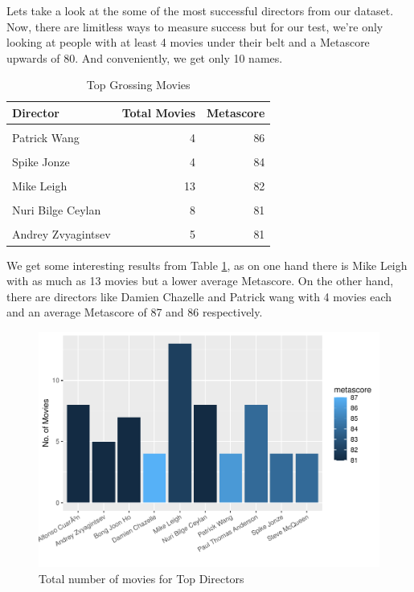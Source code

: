 \documentclass[11pt,a4paper,]{article}
\begin{document}
Lets take a look at the some of the most successful directors from our dataset. Now, there are limitless ways to measure success but for our test, we're only looking at people with at least 4 movies under their belt and a Metascore upwards of 80. And conveniently, we get only 10 names.

\begin{table}[!h]

\caption{\label{tab:dirtab}Top Grossing Movies}
\centering
\begin{tabular}[t]{l|r|r}
\hline
Director & Total Movies & Metascore\\
\hline
\cellcolor{gray!6}{Damien Chazelle} & \cellcolor{gray!6}{4} & \cellcolor{gray!6}{87}\\
\hline
Patrick Wang & 4 & 86\\
\hline
\cellcolor{gray!6}{Paul Thomas Anderson} & \cellcolor{gray!6}{8} & \cellcolor{gray!6}{84}\\
\hline
Spike Jonze & 4 & 84\\
\hline
\cellcolor{gray!6}{Steve McQueen} & \cellcolor{gray!6}{4} & \cellcolor{gray!6}{84}\\
\hline
Mike Leigh & 13 & 82\\
\hline
\cellcolor{gray!6}{Alfonso CuarÃ³n} & \cellcolor{gray!6}{8} & \cellcolor{gray!6}{81}\\
\hline
Nuri Bilge Ceylan & 8 & 81\\
\hline
\cellcolor{gray!6}{Bong Joon Ho} & \cellcolor{gray!6}{7} & \cellcolor{gray!6}{81}\\
\hline
Andrey Zvyagintsev & 5 & 81\\
\hline
\end{tabular}
\end{table}

We get some interesting results from Table \ref{tab:dirtab}, as on one hand there is Mike Leigh with as much as 13 movies but a lower average Metascore. On the other hand, there are directors like Damien Chazelle and Patrick wang with 4 movies each and an average Metascore of 87 and 86 respectively.

\begin{figure}
\centering
\includegraphics{Report_files/figure-latex/dirfig2-1.pdf}
\caption{\label{fig:dirfig2}Total number of movies for Top Directors}
\end{figure}
\end{document}
